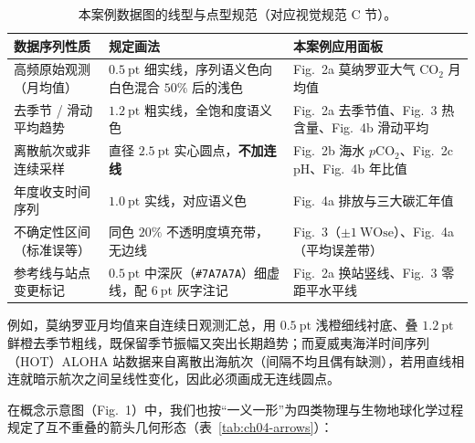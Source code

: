 \begin{table}[htbp]\centering\footnotesize
\setlength{\tabcolsep}{4pt}
\renewcommand{\arraystretch}{1.15}
\caption{本案例数据图的线型与点型规范（对应视觉规范 C 节）。}\label{tab:ch04-lines}
\begin{tabularx}{\linewidth}{@{}>{\raggedright\arraybackslash}p{36mm}Y>{\raggedright\arraybackslash}p{42mm}@{}}
\toprule
\textbf{数据序列性质} & \textbf{规定画法} & \textbf{本案例应用面板} \\
\midrule
高频原始观测（月均值） & $0.5\ \text{pt}$ 细实线，序列语义色向白色混合 $50\%$ 后的浅色 & Fig.\ 2a 莫纳罗亚大气 $\text{CO}_2$ 月均值 \\
去季节 / 滑动平均趋势 & $1.2\ \text{pt}$ 粗实线，全饱和度语义色 & Fig.\ 2a 去季节值、Fig.\ 3 热含量、Fig.\ 4b 滑动平均 \\
离散航次或非连续采样 & 直径 $2.5\ \text{pt}$ 实心圆点，\textbf{不加连线} & Fig.\ 2b 海水 $p\text{CO}_2$、Fig.\ 2c pH、Fig.\ 4b 年比值 \\
年度收支时间序列 & $1.0\ \text{pt}$ 实线，对应语义色 & Fig.\ 4a 排放与三大碳汇年值 \\
不确定性区间（标准误等） & 同色 $20\%$ 不透明度填充带，无边线 & Fig.\ 3（$\pm 1\ \text{WOse}$）、Fig.\ 4a（平均误差带） \\
参考线与站点变更标记 & $0.5\ \text{pt}$ 中深灰（\texttt{\#7A7A7A}）细虚线，配 $6\ \text{pt}$ 灰字注记 & Fig.\ 2a 换站竖线、Fig.\ 3 零距平水平线 \\
\bottomrule
\end{tabularx}
\end{table}

例如，莫纳罗亚月均值来自连续日观测汇总，用 $0.5\ \text{pt}$ 浅橙细线衬底、叠 $1.2\ \text{pt}$ 鲜橙去季节粗线，既保留季节振幅又突出长期趋势；而夏威夷海洋时间序列（HOT）ALOHA 站数据来自离散出海航次（间隔不均且偶有缺测），若用直线相连就暗示航次之间呈线性变化，因此必须画成无连线圆点。

在概念示意图（Fig.\ 1）中，我们也按“一义一形”为四类物理与生物地球化学过程规定了互不重叠的箭头几何形态（表~\ref{tab:ch04-arrows}）：

